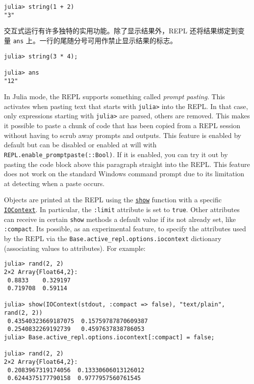 \begin{verbatim}
julia> string(1 + 2)
"3"
\end{verbatim}



交互式运行有许多独特的实用功能。除了显示结果外，REPL 还将结果绑定到变量 \texttt{ans} 上。一行的尾随分号可用作禁止显示结果的标志。




\begin{verbatim}
julia> string(3 * 4);

julia> ans
"12"
\end{verbatim}



In Julia mode, the REPL supports something called \emph{prompt pasting}. This activates when pasting text that starts with \texttt{julia>} into the REPL. In that case, only expressions starting with \texttt{julia>} are parsed, others are removed. This makes it possible to paste a chunk of code that has been copied from a REPL session without having to scrub away prompts and outputs. This feature is enabled by default but can be disabled or enabled at will with \texttt{REPL.enable\_promptpaste(::Bool)}. If it is enabled, you can try it out by pasting the code block above this paragraph straight into the REPL. This feature does not work on the standard Windows command prompt due to its limitation at detecting when a paste occurs.



Objects are printed at the REPL using the \hyperlink{4561869563484222675}{\texttt{show}} function with a specific \hyperlink{13454403377667762339}{\texttt{IOContext}}. In particular, the \texttt{:limit} attribute is set to \texttt{true}. Other attributes can receive in certain \texttt{show} methods a default value if it{\textquotesingle}s not already set, like \texttt{:compact}. It{\textquotesingle}s possible, as an experimental feature, to specify the attributes used by the REPL via the \texttt{Base.active\_repl.options.iocontext} dictionary (associating values to attributes). For example:




\begin{verbatim}
julia> rand(2, 2)
2×2 Array{Float64,2}:
 0.8833    0.329197
 0.719708  0.59114

julia> show(IOContext(stdout, :compact => false), "text/plain", rand(2, 2))
 0.43540323669187075  0.15759787870609387
 0.2540832269192739   0.4597637838786053
julia> Base.active_repl.options.iocontext[:compact] = false;

julia> rand(2, 2)
2×2 Array{Float64,2}:
 0.2083967319174056  0.13330606013126012
 0.6244375177790158  0.9777957560761545
\end{verbatim}



